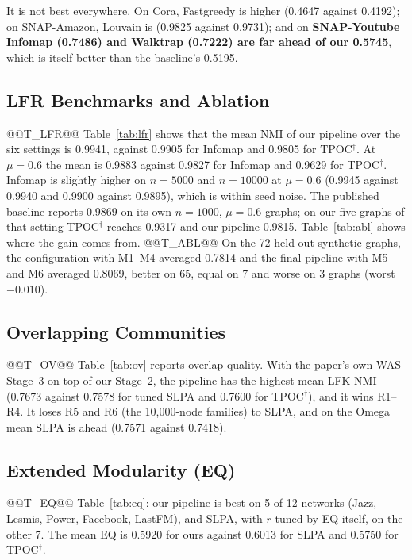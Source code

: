 \documentclass[conference]{IEEEtran}
\begin{document}
It is not best everywhere. On Cora, Fastgreedy is higher (0.4647 against 0.4192); on SNAP-Amazon, Louvain is (0.9825 against 0.9731); and on \textbf{SNAP-Youtube Infomap (0.7486) and Walktrap (0.7222) are far ahead of our 0.5745}, which is itself better than the baseline's 0.5195.

\subsection{LFR Benchmarks and Ablation}
@@T_LFR@@
Table~\ref{tab:lfr} shows that the mean NMI of our pipeline over the six settings is 0.9941, against 0.9905 for Infomap and 0.9805 for TPOC$^{\dagger}$. At $\mu{=}0.6$ the mean is 0.9883 against 0.9827 for Infomap and 0.9629 for TPOC$^{\dagger}$. Infomap is slightly higher on $n{=}5000$ and $n{=}10000$ at $\mu{=}0.6$ (0.9945 against 0.9940 and 0.9900 against 0.9895), which is within seed noise. The published baseline reports 0.9869 on its own $n{=}1000$, $\mu{=}0.6$ graphs; on our five graphs of that setting TPOC$^{\dagger}$ reaches 0.9317 and our pipeline 0.9815. Table~\ref{tab:abl} shows where the gain comes from.
@@T_ABL@@
On the 72 held-out synthetic graphs, the configuration with M1--M4 averaged 0.7814 and the final pipeline with M5 and M6 averaged 0.8069, better on 65, equal on 7 and worse on 3 graphs (worst $-0.010$).

\subsection{Overlapping Communities}
@@T_OV@@
Table~\ref{tab:ov} reports overlap quality. With the paper's own WAS Stage~3 on top of our Stage~2, the pipeline has the highest mean LFK-NMI (0.7673 against 0.7578 for tuned SLPA and 0.7600 for TPOC$^{\dagger}$), and it wins R1--R4. It loses R5 and R6 (the 10{,}000-node families) to SLPA, and on the Omega mean SLPA is ahead (0.7571 against 0.7418).

\subsection{Extended Modularity (EQ)}
@@T_EQ@@
Table~\ref{tab:eq}: our pipeline is best on 5 of 12 networks (Jazz, Lesmis, Power, Facebook, LastFM), and SLPA, with $r$ tuned by EQ itself, on the other 7. The mean EQ is 0.5920 for ours against 0.6013 for SLPA and 0.5750 for TPOC$^{\dagger}$.
\end{document}
